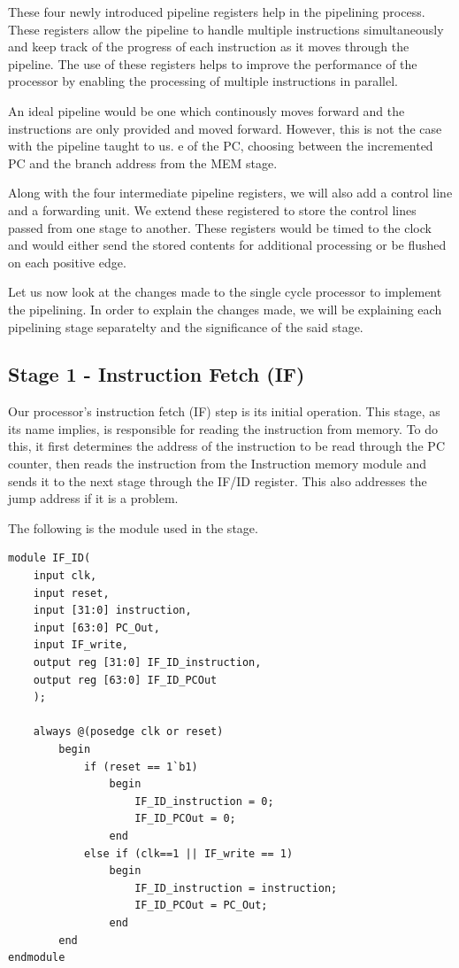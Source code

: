 \documentclass{article}
\begin{document}
These four newly introduced pipeline registers help in the pipelining process. These registers allow the pipeline to handle multiple instructions simultaneously and keep track of the progress of each instruction as it moves through the pipeline. The use of these registers helps to improve the performance of the processor by enabling the processing of multiple instructions in parallel.

An ideal pipeline would be one which continously moves forward and the instructions are only provided and moved forward. However, this is not the case with the pipeline taught to us. e of the PC, choosing between the
incremented PC and the branch address from the MEM stage. 

Along with the four intermediate pipeline registers, we will also add a control line and a forwarding unit. We extend these registered to store the control lines passed from one stage to another. These registers would be timed to the clock and would either send the stored contents for additional processing or be flushed on each positive edge.

Let us now look at the changes made to the single cycle processor to implement the pipelining. In order to explain the changes made, we will be explaining each pipelining stage separatelty and the significance of the said stage. 

\subsection*{Stage 1 - Instruction Fetch (IF)}

Our processor's instruction fetch (IF) step is its initial operation. This stage, as its name implies, is responsible for reading the instruction from memory. To do this, it first determines the address of the instruction to be read through the PC counter, then reads the instruction from the Instruction memory module and sends it to the next stage through the IF/ID register. This also addresses the jump address if it is a problem.

The following is the module used in the stage. 

\begin{lstlisting}[caption={IF/ID Register}, captionpos=b, language=RISC-V]
module IF_ID(
    input clk,
    input reset,
    input [31:0] instruction,
    input [63:0] PC_Out,
    input IF_write,
    output reg [31:0] IF_ID_instruction,
    output reg [63:0] IF_ID_PCOut
    );
    
    always @(posedge clk or reset)
        begin
            if (reset == 1`b1)
                begin
                    IF_ID_instruction = 0;
                    IF_ID_PCOut = 0;
                end
            else if (clk==1 || IF_write == 1)
                begin
                    IF_ID_instruction = instruction;
                    IF_ID_PCOut = PC_Out;
                end
        end   
endmodule
\end{lstlisting}
\end{document}
